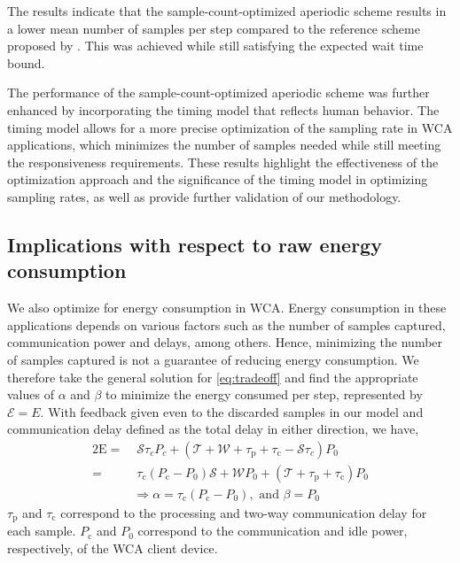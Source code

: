 The results indicate that the sample-count-optimized aperiodic scheme results in a lower mean number of samples per step compared to the reference scheme proposed by \citeauthor{wang2019towards}.
This was achieved while still satisfying the expected wait time bound.

The performance of the sample-count-optimized aperiodic scheme was further enhanced by incorporating the timing model that reflects human behavior.
The timing model allows for a more precise optimization of the sampling rate in \gls{WCA} applications, which minimizes the number of samples needed while still meeting the responsiveness requirements.
These results highlight the effectiveness of the optimization approach and the significance of the timing model in optimizing sampling rates, as well as provide further validation of our methodology.


\subsection{Implications with respect to raw energy consumption}\label{ssec:implications:energy}

We also optimize for energy consumption in \gls{WCA}.
Energy consumption in these applications depends on various factors such as the number of samples captured, communication power and delays, among others.
Hence, minimizing the number of samples captured is not a guarantee of reducing energy consumption.
We therefore take the general solution for \cref{eq:tradeoff} and find the appropriate values of \ensuremath{\alpha} and \ensuremath{\beta} to minimize the energy consumed per step, represented by \ensuremath{\mathcal{E}=E}.
With feedback given even to the discarded samples in our model and communication delay defined as the total delay in either direction, we have,
\begin{alignat}{2}
    \mathrm{E}=&\;\mathcal{S}\tau_cP_c+(\mathcal{T}+\mathcal{W}+\tau_\mathrm{p}+\tau_\mathrm{c}-\mathcal{S}\tau_c)P_0\nonumber\\
    =&\;\tau_{\text{c}}(P_{\text{c}} -P_0)\mathcal{S}+\mathcal{W}P_0+(\mathcal{T}+\tau_{\text{p}} +\tau_{\text{c}}) P_0\nonumber\\
    &\Rightarrow \alpha=\tau_{\text{c}}(P_{\text{c}} -P_0),\text{ and }\beta=P_0
\end{alignat}
\( \tau_\text{p} \) and \( \tau_\text{c} \) correspond to the processing and two-way communication delay for each sample.
\( P_\text{c} \) and \( P_0 \) correspond to the communication and idle power, respectively, of the \gls{WCA} client device.


